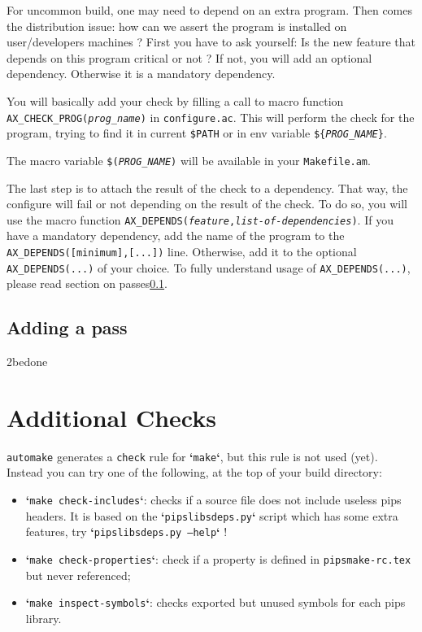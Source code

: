 \documentclass[a4paper]{article}
\newcommand{\automake}{\texttt{automake}}
\newcommand{\file}[1]{\texttt{#1}}
\newcommand{\cmd}[1]{\textbf{`}\texttt{#1}\textbf{`}}
\begin{document}
For uncommon build, one may need to depend on an extra program.
Then comes the distribution issue: how can we assert the program is installed on user/developers machines ?
First you have to ask yourself: Is the new feature that depends on this program critical or not ?
If not, you will add an optional dependency.
Otherwise it is a mandatory dependency.

You will basically add your check by filling a call to macro function \texttt{AX\_CHECK\_PROG(\textit{prog\_name})}
in \file{configure.ac}.
This will perform the check for the program, trying to find it in current \texttt{\$PATH} or
in env variable \texttt{\$\{\textit{PROG\_NAME}\}}.

The macro variable \texttt{\$(\textit{PROG\_NAME})} will be available in your \file{Makefile.am}.

The last step is to attach the result of the check to a dependency.
That way, the configure will fail or not depending on the result of the check.
To do so, you will use the macro function \texttt{AX\_DEPENDS(\textit{feature},\textit{list-of-dependencies})}.
If you have a mandatory dependency, add the name of the program to the 
\lstinline|AX_DEPENDS([minimum],[...])| line.
Otherwise, add it to the optional \texttt{AX\_DEPENDS(...)} of your choice.
To fully understand usage of \texttt{AX\_DEPENDS(...)}, please read section on passes\ref{sec:passes}.

\subsection{Adding a pass}
\label{sec:passes}
2bedone


\section{Additional Checks}
\label{sec:check}

\automake{} generates a \texttt{check} rule for \cmd{make}, but this rule is not used (yet).
Instead you can try one of the following, at the top of your build directory:
\begin{itemize}
\item \cmd{make check-includes}: checks if a source file does not include useless pips headers.
It is based on the \cmd{pipslibsdeps.py} script which has some extra features, try \cmd{pipslibsdeps.py --help} !
\item \cmd{make check-properties}: check if a property is defined in \file{pipsmake-rc.tex} but never referenced;
\item \cmd{make inspect-symbols}: checks exported but unused symbols for each pips library.
\end{itemize}

\begin{acronym}
\end{acronym}
\end{document}
